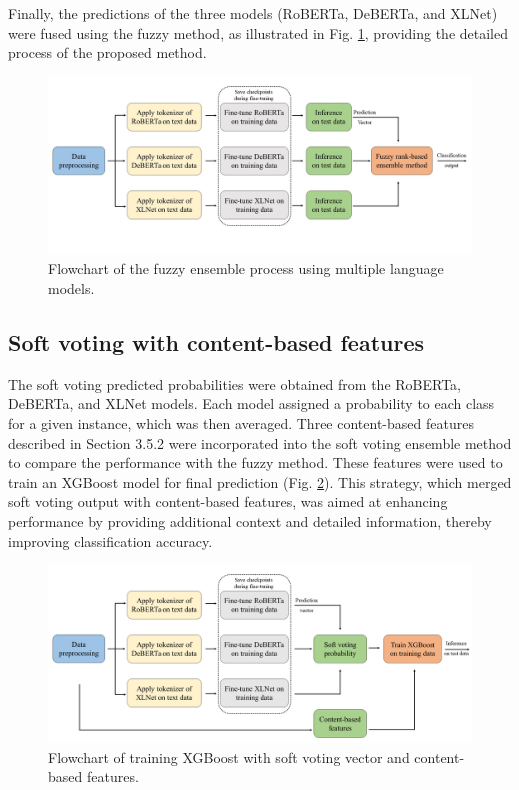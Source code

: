 Finally, the predictions of the three models (RoBERTa, DeBERTa, and XLNet) were fused using the fuzzy method, as illustrated in Fig. \ref{fig:process of proposed method}, providing the detailed process of the proposed method.

\begin{figure}
    \centering
    \includegraphics[width=1\linewidth]{img/process of proposed method.JPG}
    \caption{Flowchart of the fuzzy ensemble process using multiple language models.}
    \label{fig:process of proposed method}
\end{figure}

\subsection{Soft voting with content-based features}
The soft voting predicted probabilities were obtained from the RoBERTa, DeBERTa, and XLNet models. Each model assigned a probability to each class for a given instance, which was then averaged. Three content-based features described in Section 3.5.2 were incorporated into the soft voting ensemble method to compare the performance with the fuzzy method. These features were used to train an XGBoost model for final prediction (Fig. \ref{fig:process of content-based features method}). This strategy, which merged soft voting output with content-based features, was aimed at enhancing performance by providing additional context and detailed information, thereby improving classification accuracy. 

\begin{figure}
    \centering
    \includegraphics[width=1\linewidth]{img/soft voting with content-based features.png}
    \caption{Flowchart of training XGBoost with soft voting vector and content-based features.}
    \label{fig:process of content-based features method}
\end{figure}
